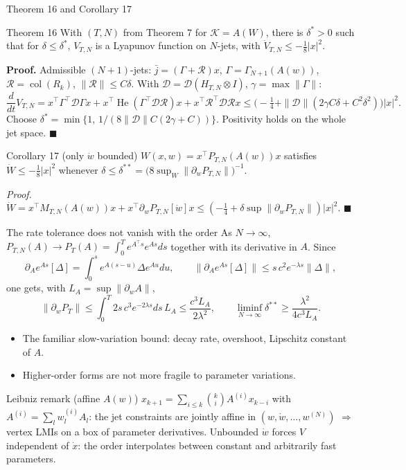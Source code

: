 \documentclass[10pt,aspectratio=169]{beamer}
\newcommand{\tr}{^{\top}}
\newcommand{\DD}{\mathcal{D}}
\newcommand{\KK}{\mathcal{K}}
\DeclareMathOperator{\He}{He}
\DeclareMathOperator{\col}{col}
\begin{document}
\begin{frame}{Theorem 16 and Corollary 17}
\begin{block}{Theorem 16}
With $(T,N)$ from Theorem 7 for $\KK=A(W)$, there is $\delta^*>0$ such that for $\delta\le\delta^*$, $V_{T,N}$ is a Lyapunov function on $N$-jets, with $\dot V_{T,N}\le-\frac18|x|^2$.
\end{block}
\textbf{Proof.} Admissible $(N+1)$-jets: $\bar j=(\Gamma+\mathcal R)x$, $\Gamma=\Gamma_{N+1}(A(w))$, $\mathcal R=\col(R_k)$, $\|\mathcal R\|\le C\delta$. With $\DD=\DD(H_{T,N}\otimes I)$, $\gamma=\max\|\Gamma\|$:
\[
\frac{d}{dt}V_{T,N}=x\tr\Gamma\tr\DD\Gamma x+x\tr\He(\Gamma\tr\DD\mathcal R)x+x\tr\mathcal R\tr\DD\mathcal Rx
\le\Big(-\tfrac14+\|\DD\|(2\gamma C\delta+C^2\delta^2)\Big)|x|^2 .
\]
Choose $\delta^*=\min\{1,\,1/(8\|\DD\|C(2\gamma+C))\}$. Positivity holds on the whole jet space. $\blacksquare$
\begin{block}{Corollary 17 (only $\dot w$ bounded)}
$W(x,w)=x\tr P_{T,N}(A(w))x$ satisfies $\dot W\le-\frac18|x|^2$ whenever $\delta\le\delta^{**}=\big(8\sup_W\|\partial_wP_{T,N}\|\big)^{-1}$.
\end{block}
\emph{Proof.} $\dot W=x\tr M_{T,N}(A(w))x+x\tr\partial_wP_{T,N}[\dot w]x\le(-\frac14+\delta\sup\|\partial_wP_{T,N}\|)|x|^2$. $\blacksquare$
\end{frame}

\begin{frame}{The rate tolerance does not vanish with the order}
As $N\to\infty$, $P_{T,N}(A)\to P_T(A)=\int_0^Te^{A\tr s}e^{As}ds$ together with its derivative in $A$. Since
\[
\partial_Ae^{As}[\Delta]=\int_0^se^{A(s-u)}\Delta e^{Au}du,\qquad \|\partial_Ae^{As}[\Delta]\|\le s\,c^2e^{-\lambda s}\|\Delta\|,
\]
one gets, with $L_A=\sup\|\partial_wA\|$,
\[
\|\partial_wP_T\|\le\int_0^T2s\,c^3e^{-2\lambda s}ds\,L_A\le\frac{c^3L_A}{2\lambda^2},\qquad\liminf_{N\to\infty}\delta^{**}\ge\frac{\lambda^2}{4c^3L_A}.
\]
\begin{itemize}
\item The familiar slow-variation bound: decay rate, overshoot, Lipschitz constant of $A$.
\item Higher-order forms are not more fragile to parameter variations.
\end{itemize}
\begin{block}{Leibniz remark (affine $A(w)$)}
$x_{k+1}=\sum_{i\le k}\binom ki A^{(i)}x_{k-i}$ with $A^{(i)}=\sum_lw_l^{(i)}A_l$: the jet constraints are \alert{jointly affine} in $(w,\dot w,\dots,w^{(N)})$ $\Rightarrow$ vertex LMIs on a box of parameter derivatives. Unbounded $\dot w$ forces $V$ independent of $\dot x$: the order interpolates between constant and arbitrarily fast parameters.
\end{block}
\end{frame}
\end{document}
